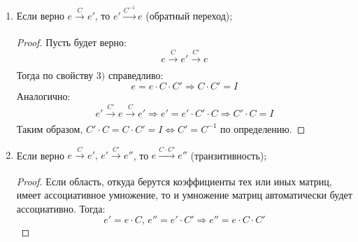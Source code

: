 \documentclass[12pt]{article}
\theoremstyle{definition}
\newcommand{\ddsum}[2]{\displaystyle\sum\limits_{#1}^{#2}}
\begin{document}
\begin{enumerate}[label=\arabic*)]
\begin{proof}
		$(\Leftarrow)$ Пусть $C$ - невырожденная матрица $n \times n \Rightarrow$ её столбцы линейно независимы $\Rightarrow$ образуют базис пространства столбцов $K^n$, иначе это была бы не максимальная система линейно независимых столбцов $\Rightarrow$ в $n$-мерном пространстве столбцов нашлась бы линейно независимая система столбцов из $(n+1)$ столбца $\Rightarrow$ противоречие с основной леммой о линейной зависимости. Следовательно, при изоморфизме $K^n \simeq V$, векторы $e'_j$, соответствующие столбцам матрицы $C$:
		$$
			\forall j = \overline{1, n}, \, e'_j = \ddsum{i = 1}{n}c_{ij}e_i = 
			\begin{pmatrix}
				e_1 & \dotsc & e_n
			\end{pmatrix}{\cdot}
			\begin{pmatrix}
				c_{1j}\\
				\vdots\\
				c_{nj}
			\end{pmatrix}
		$$
		образуют базис пространства $V$, поскольку их $n$ штук и они линейно независимы. И переход от старого базиса $e$ к новому базису $e'$ осуществляется с помощью матрицы $C$:
		$$
			 e \xrightarrow[]{C} e' = \begin{pmatrix}
				e'_1 & \dotsc & e'_n
			\end{pmatrix}
		$$
	\end{proof}
	\item Если верно $e \xrightarrow[]{C} e'$, то $e' \xrightarrow[]{C^{-1}}e$ (обратный переход);
	\begin{proof}
		Пусть будет верно:
		$$
			e \xrightarrow[]{C} e' \xrightarrow[]{C'} e
		$$
		Тогда по свойству $3)$ справедливо:
		$$
			e = e{\cdot}C{\cdot}C' \Rightarrow C{\cdot}C' = I
		$$
		Аналогично:
		$$
			e' \xrightarrow[]{C'} e \xrightarrow[]{C} e' \Rightarrow e' = e'{\cdot}C'{\cdot}C \Rightarrow C'{\cdot}C = I
		$$
		Таким образом, $C'{\cdot}C = C{\cdot}C' = I \Leftrightarrow C' = C^{-1}$ по определению.
	\end{proof}
	\item Если верно $e \xrightarrow[]{C} e', \, e' \xrightarrow[]{C'} e''$, то $e \xrightarrow[]{C{\cdot}C'} e''$ (транзитивность);
	\begin{proof}
		Если область, откуда берутся коэффициенты тех или иных матриц, имеет ассоциативное умножение, то и умножение матриц автоматически будет ассоциативно. Тогда:
		$$
			e' = e{\cdot}C, \, e'' = e'{\cdot}C' \Rightarrow e'' = e{\cdot}C{\cdot}C' 
		$$
	\end{proof}
\end{enumerate}
\end{document}
